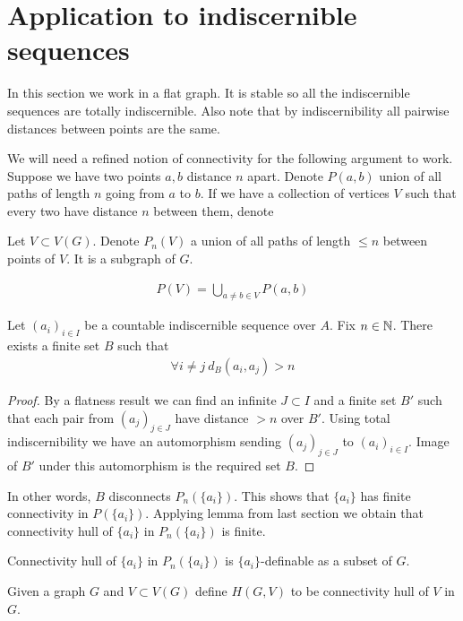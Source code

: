 \documentclass{amsart}
\begin{document}
\section{Application to indiscernible sequences}

In this section we work in a flat graph. It is stable so all the indiscernible sequences are totally indiscernible. Also note that by indiscernibility all pairwise distances between points are the same.

We will need a refined notion of connectivity for the following argument to work. Suppose we have two points $a,b$ distance $n$ apart. Denote $P(a,b)$ union of all paths of length $n$ going from $a$ to $b$. If we have a collection of vertices $V$ such that every two have distance $n$ between them, denote

Let $V \subset V(G)$. Denote $P_n(V)$ a union of all paths of length $\leq n$ between points of $V$. It is a subgraph of $G$.

\begin{align*}
	P(V) = \bigcup_{a \neq b \in V} P(a,b)
\end{align*}

\begin{Lemma}
	Let $(a_i)_{i \in I}$ be a countable indiscernible sequence over $A$. Fix $n \in \mathbb{N}$. There exists a finite set $B$ such that
	\begin{align*}
		\forall i \neq j \ d_B(a_i, a_j) > n
	\end{align*}
\end{Lemma}

\begin{proof}
	By a flatness result we can find an infinite $J \subset I$ and a finite set $B'$ such that each pair from $(a_j)_{j \in J}$ have distance $>n$ over $B'$. Using total indiscernibility we have an automorphism sending $(a_j)_{j \in J}$ to $(a_i)_{i \in I}$. Image of $B'$ under this automorphism is the required set $B$.
\end{proof}

In other words, $B$ disconnects $P_n(\{a_i\})$. This shows that $\{a_i\}$ has finite connectivity in $P(\{a_i\})$. Applying lemma from last section we obtain that connectivity hull of $\{a_i\}$ in $P_n(\{a_i\})$ is finite.

\begin{Lemma}
	Connectivity hull of $\{a_i\}$ in $P_n(\{a_i\})$ is $\{a_i\}$-definable as a subset of $G$.
\end{Lemma}

\begin{Definition}
	Given a graph $G$ and $V \subset V(G)$ define $H(G, V)$ to be connectivity hull of $V$ in $G$.
\end{Definition}
\end{document}
